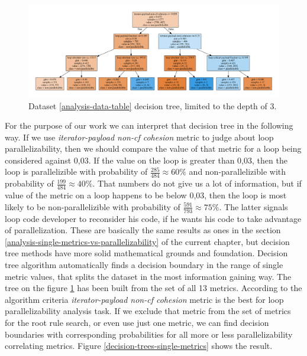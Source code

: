 \begin{figure}
	\centering
	\includegraphics[width=\linewidth]{figs/decision-tree-depth-3.pdf}
	\caption{Dataset \ref{analysis-data-table} decision tree, limited to the depth of 3.}
	\label{decision-tree-depth-3}
\end{figure}
\null\qquad For the purpose of our work we can interpret that decision tree in the following way. If we use \textit{iterator-payload non-cf cohesion} metric to judge about loop parallelizability, then we should compare the value of that metric for a loop being considered against 0,03. If the value on the loop is greater than 0,03, then the loop is parallelizible with probability of $\frac{285}{484}\approx 60\%$ and non-parallelizible with probability of $\frac{199}{484}\approx 40\%$. That numbers do not give us a lot of information, but if value of the metric on a loop happens to be below 0,03, then the loop is most likely to be non-parallelizible with probability of $\frac{591}{793}\approx 75\%$. The latter signals loop code developer to reconsider his code, if he wants his code to take advantage of parallelization.\newline
\null\qquad These are basically the same results as ones in the section \ref{analysis-single-metrics-vs-parallelizability} of the current chapter, but decision tree methods have more solid mathematical grounds and foundation. Decision tree algorithm automatically finds a decision boundary in the range of single metric values, that splits the dataset in the most information gaining way. The tree on the figure \ref{decision-tree-depth-3} has been built from the set of all 13 metrics. According to the algorithm criteria \textit{iterator-payload non-cf cohesion} metric is the best for loop parallelizability analysis task. If we exclude that metric from the set of metrics for the root rule search, or even use just one metric, we can find decision boundaries with corresponding probabilities for all more or less parallelizability correlating metrics. Figure \ref{decision-trees-single-metrics} shows the result.
